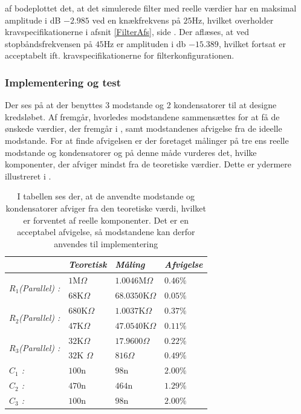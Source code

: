\noindent af bodeplottet det, at det simulerede filter med reelle værdier har en maksimal amplitude i dB $-2.985$ ved en knækfrekvens på $25$Hz, hvilket overholder kravspecifikationerne i afsnit \ref{FilterAfs}, side \pageref{FilterAfs}. Der aflæses, at ved stopbåndsfrekvensen på $45$Hz er amplituden i db $-15.389$, hvilket fortsat er acceptabelt ift. kravspecifikationerne for filterkonfigurationen. 

\subsubsection{Implementering og test} 
Der ses på  at der benyttes 3 modstande og 2 kondensatorer til at designe kredsløbet. Af  fremgår, hvorledes modstandene sammensættes for at få de ønskede værdier, der fremgår i , samt modstandenes afvigelse fra de ideelle modstande. For at finde afvigelsen er der foretaget målinger på tre ens reelle modstande og kondensatorer og på denne måde vurderes det, hvilke komponenter, der afviger mindst fra de teoretiske værdier. Dette er ydermere illustreret i .
\begin{table}[H]
	\centering
	\begin{tabular}{|l|l|l|l|}
		\hline
		\textit{}                                     & \textit{Teoretisk} & \textit{Måling}    & \textit{Afvigelse} \\ \hline
		\multirow{2}{*}{\textit{$R_{1}$(Parallel) :}} & $1$M$\Omega$       & $1.0046$M$\Omega$  & $0.46\%$           \\ \cline{2-4} 
		                                              & $68$K$\Omega$      & $68.0350$K$\Omega$ & $0.05\%$           \\ \hline
		\multirow{2}{*}{\textit{$R_{2}$(Parallel) :}} & $680$K$\Omega$     & $1.0037$K$\Omega$  & $0.37\%$           \\ \cline{2-4} 
	                                               	  & $47$K$\Omega$      & $47.0540$K$\Omega$ & $0.11\%$           \\ \hline
		\multirow{2}{*}{\textit{$R_{3}$(Parallel) :}} & $32$K$\Omega$      & $17.9600\Omega$    & $0.22\%$           \\ \cline{2-4} 
		                                              & $32$K $\Omega$     & $816\Omega$        & $0.49\%$           \\ \hline
		\textit{$C_{1}$ :}                            & $100$n             & $98$n              & $2.00\%$           \\ \hline
		\textit{$C_{2}$ :}                            & $470$n             & $464$n             & $1.29\%$           \\ \cline{2-4} 
		\textit{$C_{3}$ :}                            & $100$n             & $98$n              & $2.00\%$           \\ \hline
	\end{tabular}
	\caption{I tabellen ses der, at de anvendte modstande og kondensatorer afviger fra den teoretiske værdi, hvilket er forventet af reelle komponenter. Det er en acceptabel afvigelse, så modstandene kan derfor anvendes til implementering}
	\label{Tab:Maalingfilter}
\end{table}
